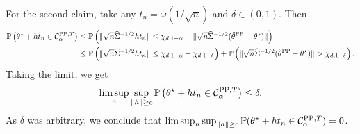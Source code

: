 For the second claim, take any $t_n = \omega(1/\sqrt{n})$ and $\delta\in(0,1)$. Then
\begin{align*}
  \mathbb{P}\left( \theta^\star + h t_n \in \mathcal{C}_\alpha^{\mathrm{PP},T}\right) &\leq \mathbb{P}\left( \|\sqrt{n}\widehat\Sigma^{-1/2}  h t_n \| \leq \chi_{d,1-\alpha} + \|\sqrt{n}\widehat\Sigma^{-1/2}  (\hat{\theta}^{\mathrm{PP}} - \theta^\star) \|\right)\\
  &\leq \mathbb{P}\left( \|\sqrt{n}\widehat\Sigma^{-1/2}  h t_n \| \leq \chi_{d,1-\alpha} + \chi_{d,1-\delta}\right) + \mathbb{P}\left( \|\sqrt{n}\widehat\Sigma^{-1/2}  (\hat{\theta}^{\mathrm{PP}} - \theta^\star) \| > \chi_{d,1-\delta}\right).
\end{align*}
Taking the limit, we get
\begin{equation*}
  \limsup_n \sup_{\|h\|\geq c} \mathbb{P}\left( \theta^\star + h t_n \in \mathcal{C}_\alpha^{\mathrm{PP},T}\right) \leq  \delta.
\end{equation*}
As $\delta$ was arbitrary, we conclude that $\limsup_n \sup_{\|h\|\geq c}
\mathbb{P}( \theta^\star + h t_n \in \mathcal{C}_\alpha^{\mathrm{PP},T}) = 0$.



